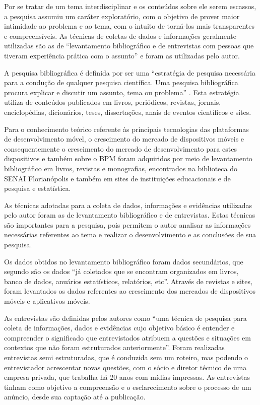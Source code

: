 \documentclass[
	12pt,				%
	openright,			%
	oneside,			%
	a4paper,			%
	chapter=TITLE,		%
	section=TITLE,		%
	english,			%
	french,				%
	spanish,			%
	brazil				%
	]{abntex2}
\begin{document}
Por se tratar de um tema interdisciplinar e os conteúdos sobre ele serem escassos, a pesquisa assumiu um caráter exploratório, com o objetivo de prover maior intimidade ao problema e ao tema, com o intuito de torná-los mais transparentes e compreensíveis. As técnicas de coletas de dados e informações geralmente utilizadas são as de “levantamento bibliográfico e de entrevistas com pessoas que tiveram experiência prática com o assunto” \cite[p. 27]{gilPesquisa} e foram as utilizadas pelo autor.

A pesquisa bibliográfica é definida por ser uma “estratégia de pesquisa necessária para a condução de qualquer pesquisa científica. Uma pesquisa bibliográfica procura explicar e discutir um assunto, tema ou problema” \cite[p. 54]{martinsTheophiloMetodologia}. Esta estratégia utiliza de conteúdos publicados em livros, periódicos, revistas, jornais, enciclopédias, dicionários, teses, dissertações, anais de eventos científicos e sites.

Para o conhecimento teórico referente às principais tecnologias das plataformas de desenvolvimento móvel, o crescimento do mercado de dispositivos móveis e consequentemente o crescimento do mercado de desenvolvimento para estes dispositivos e também sobre o BPM foram adquiridos por meio de levantamento bibliográfico em livros, revistas e monografias, encontrados na biblioteca do SENAI Florianópolis e também em sites de instituições educacionais e de pesquisa e estatística.

As técnicas adotadas para a coleta de dados, informações e evidências utilizadas pelo autor foram as de levantamento bibliográfico e de entrevistas. Estas técnicas são importantes para a pesquisa, pois permitem o autor analisar as informações necessárias referentes ao tema e realizar o desenvolvimento e as conclusões de sua pesquisa.

Os dados obtidos no levantamento bibliográfico foram dados secundários, que segundo  são os dados “já coletados que se encontram organizados em livros, banco de dados, anuários estatísticos, relatórios, etc”. Através de revistas e sites, foram levantados os dados referentes ao crescimento dos mercados de dispositivos móveis e aplicativos móveis.

As entrevistas são definidas pelos autores  como “uma técnica de pesquisa para coleta de informações, dados e evidências cujo objetivo básico é entender e compreender o significado que entrevistados atribuem a questões e situações em contextos que não foram estruturados anteriormente”. Foram realizadas entrevistas semi estruturadas, que é conduzida sem um roteiro, mas podendo o entrevistador acrescentar novas questões, com o sócio e diretor técnico de uma empresa privada, que trabalha há 20 anos com mídias impressas. As entrevistas tinham como objetivo a compreensão e o esclarecimento sobre o processo de um anúncio, desde sua captação até a publicação.
\end{document}
